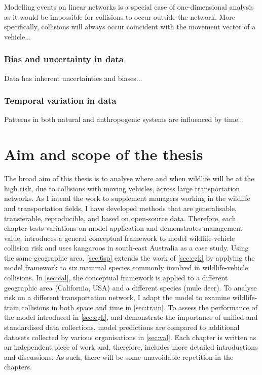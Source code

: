 Modelling events on linear networks is a special case of one-dimensional analysis as it would be impossible for collisions to occur outside the network.  More specifically, collisions will always occur coincident with the movement vector of a vehicle...

\subsubsection{Bias and uncertainty in data}

Data has inherent uncertainties and biases...

\subsubsection{Temporal variation in data}

Patterns in both natural and anthropogenic systems are influenced by time...

\section{Aim and scope of the thesis}

The broad aim of this thesis is to analyse where and when wildlife will be at the high risk, due to collisions with moving vehicles, across large transportation networks. As I intend the work to supplement managers working in the wildlife and transportation fields, I have developed methods that are generalisable, transferable, reproducible, and based on open-source data. Therefore, each chapter tests variations on model application and demonstrates management value.  introduces a general conceptual framework to model wildlife-vehicle collision risk and uses kangaroos in south-east Australia as a case study. Using the same geographic area, \cref{sec:6sp} extends the work of \cref{sec:egk} by applying the model framework to six mammal species commonly involved in wildlife-vehicle collisions. In \cref{sec:cal}, the conceptual framework is applied to a different geographic area (California, USA) and a different species (mule deer). To analyse risk on a different transportation network, I adapt the model to examine wildlife-train collisions in both space and time in \cref{sec:train}. To assess the performance of the model introduced in \cref{sec:egk}, and demonstrate the importance of unified and standardised data collections, model predictions are compared to additional datasets collected by various organisations in \cref{sec:val}. Each chapter is written as an independent piece of work and, therefore, includes more detailed introductions and discussions. As such, there will be some unavoidable repetition in the chapters.